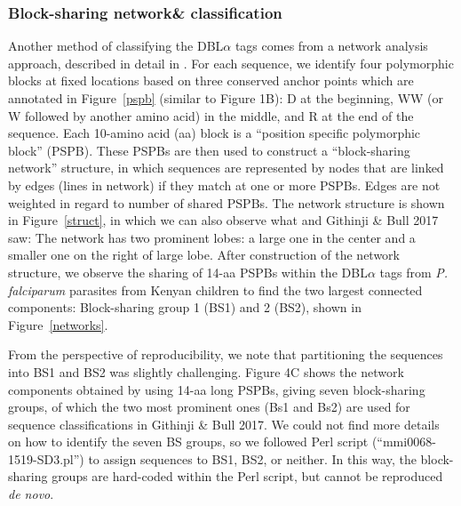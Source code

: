 \documentclass[10pt,twocolumn,superscriptaddress]{revtex4-1}
\newcommand{\pf}{{\it P. falciparum}\xspace}
\newcommand{\dbla}{{DBL$\alpha$}\xspace}
\newcommand{\paper}{{Githinji \& Bull 2017}\xspace}
\newcommand{\figdir}{figures/}
\begin{document}
\subsubsection{Block-sharing network\& classification}
Another method of classifying the \dbla tags comes from a network analysis approach, described in detail in \cite{bull2008}. For each sequence, we identify four polymorphic blocks at fixed locations based on three conserved anchor points which are annotated in Figure~\ref{pspb} (similar to \cite{bull2008} Figure 1B): D at the beginning, WW (or W followed by another amino acid) in the middle, and R at the end of the sequence. Each 10-amino acid (aa) block is a ``position specific polymorphic block'' (PSPB). These PSPBs are then used to construct a ``block-sharing network'' structure, in which sequences are represented by nodes that are linked by edges (lines in network) if they match at one or more PSPBs. Edges are not weighted in regard to number of shared PSPBs. The network structure is shown in Figure~\ref{struct}, in which we can also observe what \cite{bull2008} and \paper saw: The network has two prominent lobes: a large one in the center and a smaller one on the right of large lobe. After construction of the network structure, we observe the sharing of 14-aa PSPBs within the \dbla tags from \pf parasites from Kenyan children to find the two largest connected components: Block-sharing group 1 (BS1) and 2 (BS2), shown in Figure~\ref{networks}.  

From the perspective of reproducibility, we note that partitioning the sequences into BS1 and BS2 was slightly challenging. \cite{bull2008} Figure 4C shows the network components obtained by using 14-aa long PSPBs, giving seven block-sharing groups, of which the two most prominent ones (Bs1 and Bs2) are used for sequence classifications in \paper. We could not find more details on how to identify the seven BS groups, so we followed \cite{bull2008} Perl script (``mmi0068-1519-SD3.pl'') to assign sequences to BS1, BS2, or neither. In this way, the block-sharing groups are hard-coded within the Perl script, but cannot be reproduced \textit{de novo}.  

\end{document}
